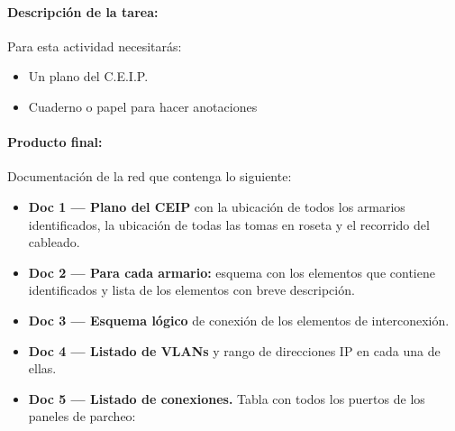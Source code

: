 \documentclass[
  spanish,
  11pt,
  paper=a4,
  ,captions=tableheading
]{scrartcl}
\providecommand{\tightlist}{%
  \setlength{\itemsep}{0pt}\setlength{\parskip}{0pt}}
\begin{document}
\paragraph{Descripción de la tarea:}\label{descripciuxf3n-de-la-tarea}

Para esta actividad necesitarás:

\begin{itemize}
\tightlist
\item
  Un plano del C.E.I.P.
\item
  Cuaderno o papel para hacer anotaciones
\end{itemize}

\paragraph{Producto final:}\label{producto-final}

Documentación de la red que contenga lo siguiente:

\begin{itemize}
\tightlist
\item
  \textbf{Doc 1 --- Plano del CEIP} con la ubicación de todos los
  armarios identificados, la ubicación de todas las tomas en roseta y el
  recorrido del cableado.
\item
  \textbf{Doc 2 --- Para cada armario:} esquema con los elementos que
  contiene identificados y lista de los elementos con breve descripción.
\item
  \textbf{Doc 3 --- Esquema lógico} de conexión de los elementos de
  interconexión.
\item
  \textbf{Doc 4 --- Listado de VLANs} y rango de direcciones IP en cada
  una de ellas.
\item
  \textbf{Doc 5 --- Listado de conexiones.} Tabla con todos los puertos
  de los paneles de parcheo:
\end{itemize}

\small
\end{document}
